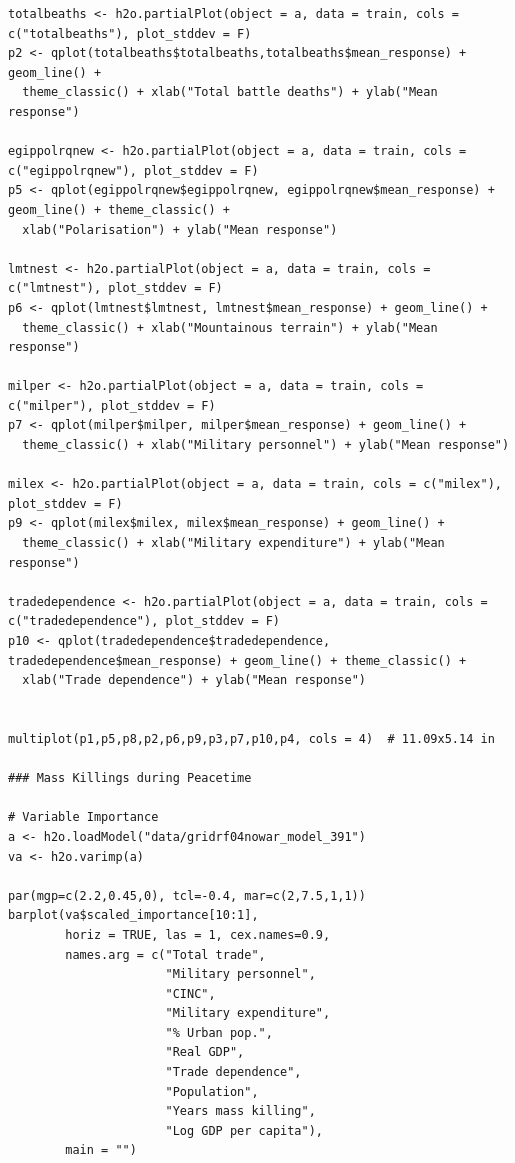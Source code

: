 \begin{verbatim}
totalbeaths <- h2o.partialPlot(object = a, data = train, cols = c("totalbeaths"), plot_stddev = F)
p2 <- qplot(totalbeaths$totalbeaths,totalbeaths$mean_response) + geom_line() +
  theme_classic() + xlab("Total battle deaths") + ylab("Mean response")

egippolrqnew <- h2o.partialPlot(object = a, data = train, cols = c("egippolrqnew"), plot_stddev = F)
p5 <- qplot(egippolrqnew$egippolrqnew, egippolrqnew$mean_response) + geom_line() + theme_classic() +
  xlab("Polarisation") + ylab("Mean response")

lmtnest <- h2o.partialPlot(object = a, data = train, cols = c("lmtnest"), plot_stddev = F)
p6 <- qplot(lmtnest$lmtnest, lmtnest$mean_response) + geom_line() +
  theme_classic() + xlab("Mountainous terrain") + ylab("Mean response")

milper <- h2o.partialPlot(object = a, data = train, cols = c("milper"), plot_stddev = F)
p7 <- qplot(milper$milper, milper$mean_response) + geom_line() +
  theme_classic() + xlab("Military personnel") + ylab("Mean response")

milex <- h2o.partialPlot(object = a, data = train, cols = c("milex"), plot_stddev = F)
p9 <- qplot(milex$milex, milex$mean_response) + geom_line() +
  theme_classic() + xlab("Military expenditure") + ylab("Mean response")

tradedependence <- h2o.partialPlot(object = a, data = train, cols = c("tradedependence"), plot_stddev = F)
p10 <- qplot(tradedependence$tradedependence, tradedependence$mean_response) + geom_line() + theme_classic() +
  xlab("Trade dependence") + ylab("Mean response")


multiplot(p1,p5,p8,p2,p6,p9,p3,p7,p10,p4, cols = 4)  # 11.09x5.14 in

### Mass Killings during Peacetime

# Variable Importance
a <- h2o.loadModel("data/gridrf04nowar_model_391")
va <- h2o.varimp(a)

par(mgp=c(2.2,0.45,0), tcl=-0.4, mar=c(2,7.5,1,1))
barplot(va$scaled_importance[10:1],
        horiz = TRUE, las = 1, cex.names=0.9,
        names.arg = c("Total trade",
                      "Military personnel",
                      "CINC",
                      "Military expenditure",
                      "% Urban pop.",
                      "Real GDP",
                      "Trade dependence", 
                      "Population", 
                      "Years mass killing",
                      "Log GDP per capita"),
        main = "")



\end{verbatim}
